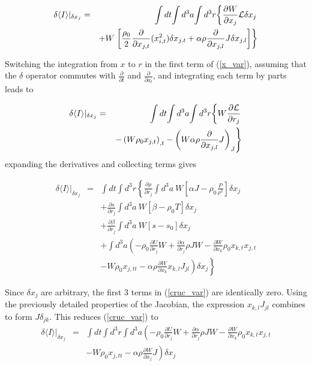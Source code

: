 \begin{eqnarray}\label{x_var}
\delta \langle I \rangle \vert_{\delta x_j} & = & \int dt\! \int d^3a\! \int d^3r\!
	 \left\{
		  \frac{\partial W}{\partial x_j} {\cal L} \delta x_j 
	 	  \right. \nonumber \\
		  & & + W \left. 
		\left[  \frac{\rho_0}{2} \frac{\partial}{\partial x_{j,t}} 
			(x_{i,t}^2) \delta x_{j,t} + \alpha \rho \frac{\partial}
			{\partial x_{j,l}} J \delta x_{j,l} 
		\right] 
	\right\}
\end{eqnarray}

Switching the integration from $x$ to $r$ in the first term of (\ref{x_var}), assuming that the $\delta$ operator commutes with $\frac{\partial}{\partial t}$ and $\frac{\partial}{\partial a_l}$, and integrating each term by parts leads to

\begin{eqnarray}
\delta \langle I \rangle \vert_{\delta x_j} & = & \int dt\! \int d^3a\! \int d^3r\! 
	\left\{ 
		W \frac{\partial {\cal L}}{\partial r_j} \right. \nonumber \\
		& & \left. - \left( W \rho_0 x_{j,t} \right)_{,t} - \left( W \alpha 
		\rho \frac{\partial}{\partial x_{j,l}} J \right)_{,l} 
	\right\}
\end{eqnarray}
expanding the derivatives and collecting terms gives

\begin{eqnarray}\label{cruc_var}
\delta \langle I \rangle \vert_{\delta x_j} & = & \int dt\! \int d^3r\! 
	\left\{
		\frac{\partial \rho}{\partial r_j}
		\int d^3a\: W \left[ \alpha J - \rho_0 \frac{P}{\rho^2} \right]
	 	\delta x_j \right. \nonumber \\
%
		 & & +
		\frac{\partial s}{\partial r_j}
		\int d^3a\: W \left[ \beta - \rho_0 T \right]
	 	\delta x_j \nonumber \\
%
		 & & +
		\frac{\partial \beta}{\partial r_j}
		\int d^3a\: W \left[ s - s_0 \right]
	 	\delta x_j \nonumber \\
%
		& & +
		\int d^3a  \left( -\rho_0 \frac{\partial U}{\partial r_j} W 
		+ \frac{\partial \alpha}{\partial r_j} \rho J W
		- \frac{\partial W}{\partial x_k} \rho_0 x_{k,t} x_{j,t}
		\right. \nonumber \\
%
		& & - \left. \left.
		W \rho_0 x_{j,tt}
		- \alpha \rho \frac{\partial W}{\partial x_k} x_{k,l} J_{jl}
	 	\right) \delta x_j
	\right\}
\end{eqnarray}
	
Since $\delta x_j$ are arbitrary, the first 3 terms in (\ref{cruc_var}) are identically zero.  Using the previously detailed properties of the Jacobian, the expression $x_{k,l} J_{jl}$ combines to form $J \delta_{jk}$.  This reduces (\ref{cruc_var}) to
\begin{eqnarray}
\delta \langle I \rangle \vert_{\delta x_j} & = & \int dt\! \int d^3r\! \int d^3a\!
	\left(	
		-\rho_0 \frac{\partial U}{\partial r_j} W 
		+ \frac{\partial \alpha}{\partial r_j} \rho J W
		- \frac{\partial W}{\partial x_k} \rho_0 x_{k,t} x_{j,t}
	\right. \nonumber \\
	& & 
	\left.
		- W \rho_0 x_{j,tt}
		- \alpha \rho \frac{\partial W}{\partial x_j} J
 	\right) 
	\delta x_j
\end{eqnarray}

